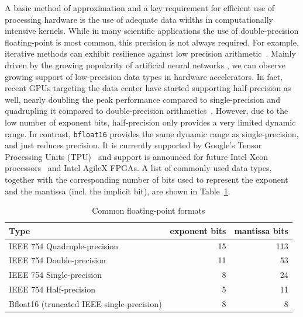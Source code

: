 \documentclass[format=acmsmall,review,timestamp,urlbreakonhyphens]{acmart}
\begin{document}
A basic method of approximation and a key requirement for efficient use of processing hardware is the use of adequate data widths in computationally intensive kernels. While in many scientific applications the use of double-precision floating-point is most common, this precision is not always required. For example, iterative methods can exhibit resilience against low precision arithmetic~\cite{Strzodka2006, Bekas, Dongarra2017, lass17-esl, Dongarra2018, LassAC}. Mainly driven by the growing popularity of artificial neural networks \cite{Gupta2015}, we can observe growing support of low-precision data types %
in hardware accelerators.
%
In fact, recent GPUs targeting the data center have started supporting half-precision as well, nearly doubling the peak performance compared to single-precision and quadrupling it compared to double-precision arithmetics~\cite{tesla}. However, due to the low number of exponent bits, half-precision only provides a very limited dynamic range. In contrast, \texttt{bfloat16} provides the same dynamic range as single-precision, and just reduces precision. It is currently supported by Google's Tensor Processing Units (TPU)~\cite{tpu} and support is announced for future Intel Xeon processors~\cite{xeon} and Intel AgileX FPGAs. A list of commonly used data types, together with the corresponding number of bits used to represent the exponent and the mantissa (incl. the implicit bit), are shown in Table~\ref{tab:float}.
\begin{table}
  \caption{Common floating-point formats}
  \label{tab:float}
  \begin{tabular}{lrr}
    Type & exponent bits & mantissa bits \\
    \hline
    IEEE 754 Quadruple-precision & 15 & 113 \\
    IEEE 754 Double-precision & 11 & 53 \\
    IEEE 754 Single-precision & 8 & 24 \\
    IEEE 754 Half-precision & 5 & 11 \\
    Bfloat16 (truncated IEEE single-precision)& 8 & 8
  \end{tabular}
\end{table}

\end{document}

